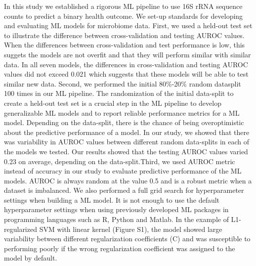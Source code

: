 \documentclass[11pt,]{article}
\begin{document}
In this study we established a rigorous ML pipeline to use 16S rRNA
sequence counts to predict a binary health outcome. We set-up standards
for developing and evaluating ML models for microbiome data. First, we
used a held-out test set to illustrate the difference between
cross-validation and testing AUROC values. When the differences between
cross-validation and test performance is low, this suggets the models
are not overfit and that they will perform similar with similar data. In
all seven models, the differences in cross-validation and testing AUROC
values did not exceed 0.021 which suggests that these models will be
able to test similar new data. Second, we performed the initial
80\%-20\% random datasplit 100 times in our ML pipeline. The
randomization of the initial data-split to create a held-out test set is
a crucial step in the ML pipeline to develop generalizable ML models and
to report reliable performance metrics for a ML model. Depending on the
data-split, there is the chance of being overoptimistic about the
predictive performance of a model. In our study, we showed that there
was variability in AUROC values between different random data-splits in
each of the models we tested. Our results showed that the testing AUROC
values varied 0.23 on average, depending on the data-split.Third, we
used AUROC metric instead of accuracy in our study to evaluate
predictive performance of the ML models. AUROC is always random at the
value 0.5 and is a robust metric when a dataset is imbalanced. We also
performed a full grid search for hyperparameter settings when building a
ML model. It is not enough to use the default hyperparameter settings
when using previously developed ML packages in programming languages
such as R, Python and Matlab. In the example of L1-regularized SVM with
linear kernel (Figure S1), the model showed large variability between
different regularization coefficients (C) and was susceptible to
performing poorly if the wrong regularization coefficient was assigned
to the model by default.
\end{document}
